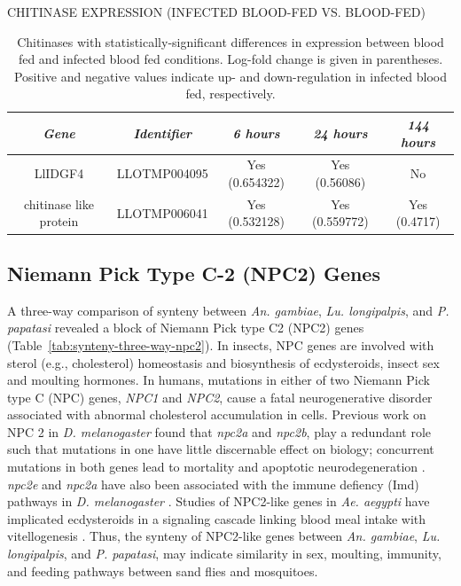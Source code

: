 \begin{table}[H]
  \centering
  \caption{CHITINASE EXPRESSION (INFECTED BLOOD-FED VS. BLOOD-FED)}
  \begin{tabular}{ c c c c c } \hline
    \emph{Gene} & \emph{Identifier} & \emph{6 hours} & \emph{24 hours} & \emph{144 hours} \\ \hline
    LlIDGF4 & LLOTMP004095 & Yes (0.654322) & Yes (0.56086) & No \\
    chitinase like protein & LLOTMP006041 & Yes (0.532128) & Yes (0.559772) & Yes (0.4717)
  \end{tabular}
  \caption*{Chitinases with statistically-significant differences in expression between blood fed and infected blood fed conditions. Log-fold change is given in parentheses. Positive and negative values indicate up- and down-regulation in infected blood fed, respectively.}
  \label{tab:sandflies:stat-sig-chitinases-bi}
\end{table}


\subsection{Niemann Pick Type C-2 (NPC2) Genes}
A three-way comparison of synteny between \emph{An. gambiae}, \emph{Lu. longipalpis}, and \emph{P. papatasi} revealed a block of Niemann Pick type C2 (NPC2) genes (Table~\ref{tab:synteny-three-way-npc2}). In insects, NPC genes are involved with sterol (e.g., cholesterol) homeostasis and biosynthesis of ecdysteroids, insect sex and moulting hormones. In humans, mutations in either of two Niemann Pick type C (NPC) genes, \emph{NPC1} and \emph{NPC2}, cause a fatal neurogenerative disorder associated with abnormal cholesterol accumulation in cells.  Previous work on NPC 2 in \emph{D. melanogaster} found that \emph{npc2a} and \emph{npc2b}, play a redundant role such that mutations in one have little discernable effect on biology; concurrent mutations in both genes lead to mortality and apoptotic neurodegeneration \cite{Huang2007}.  \emph{npc2e} and \emph{npc2a} have also been associated with the immune defiency (Imd) pathways in \emph{D. melanogaster} \cite{Shi2012}. Studies of NPC2-like genes in \emph{Ae. aegypti} have implicated ecdysteroids in a signaling cascade linking blood meal intake with vitellogenesis \cite{Sirot2011}.  Thus, the synteny of NPC2-like genes between \emph{An. gambiae}, \emph{Lu. longipalpis}, and \emph{P. papatasi}, may indicate similarity in sex, moulting, immunity, and feeding pathways between sand flies and mosquitoes.

